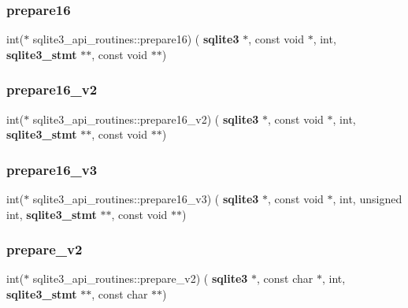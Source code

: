 \mbox{\label{structsqlite3__api__routines_a6f08b1665a9ac05e3b7fab0bd8adce32}} 
\subsubsection{prepare16}
{\footnotesize\ttfamily int($\ast$ sqlite3\+\_\+api\+\_\+routines\+::prepare16) (\textbf{ sqlite3} $\ast$, const void $\ast$, int, \textbf{ sqlite3\+\_\+stmt} $\ast$$\ast$, const void $\ast$$\ast$)}

\mbox{\label{structsqlite3__api__routines_a0efd64fdd8df6a3c49fcfbe2279a2fb9}} 
\subsubsection{prepare16\_v2}
{\footnotesize\ttfamily int($\ast$ sqlite3\+\_\+api\+\_\+routines\+::prepare16\+\_\+v2) (\textbf{ sqlite3} $\ast$, const void $\ast$, int, \textbf{ sqlite3\+\_\+stmt} $\ast$$\ast$, const void $\ast$$\ast$)}

\mbox{\label{structsqlite3__api__routines_a78d99593cbe26cc7cfee771a218c6393}} 
\subsubsection{prepare16\_v3}
{\footnotesize\ttfamily int($\ast$ sqlite3\+\_\+api\+\_\+routines\+::prepare16\+\_\+v3) (\textbf{ sqlite3} $\ast$, const void $\ast$, int, unsigned int, \textbf{ sqlite3\+\_\+stmt} $\ast$$\ast$, const void $\ast$$\ast$)}

\mbox{\label{structsqlite3__api__routines_aba67c71ba4ca3edf942ebe2c38ba93ad}} 
\subsubsection{prepare\_v2}
{\footnotesize\ttfamily int($\ast$ sqlite3\+\_\+api\+\_\+routines\+::prepare\+\_\+v2) (\textbf{ sqlite3} $\ast$, const char $\ast$, int, \textbf{ sqlite3\+\_\+stmt} $\ast$$\ast$, const char $\ast$$\ast$)}

